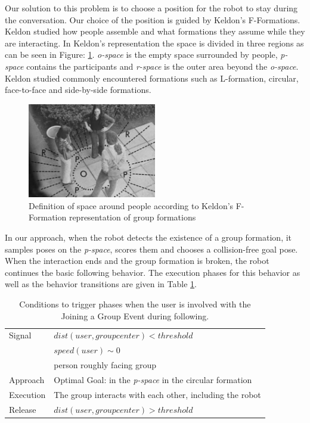 Our solution to this problem is to choose a position for the robot to stay during the conversation. Our choice of the position is guided by Keldon's F-Formations. Keldon studied how people assemble and what formations they assume while they are interacting. In Keldon's representation the space is divided in three regions as can be seen in Figure: \ref{fig:keldon}. \textit{o-space} is the empty space surrounded by people,  \textit{p-space} contains the participants and \textit{r-space} is the outer area beyond the \textit{o-space}. Keldon studied commonly encountered formations such as L-formation, circular, face-to-face and side-by-side formations.

\begin{figure}[ht!]
\centering
\includegraphics[width=0.5\textwidth]{pics/keldon}
\caption{Definition of space around people according to Keldon's F-Formation representation of group formations}
\label{fig:keldon}
\end{figure}

In our approach, when the robot detects the existence of a group formation, it samples poses on the \textit{p-space}, scores them and chooses a collision-free goal pose. When the interaction ends and the group formation is broken, the robot continues the basic following behavior. The execution phases for this behavior as well as the behavior transitions are given in Table \ref{table:situation_aware_list_group}.



\begin{table}[ht!]

    \caption{Conditions to trigger phases when the user is involved with the Joining a Group Event during following.}

    \centering
    	
  \begin{tabular}{l |  m{10cm}}    
    \toprule    
    Signal & {$dist(user, groupcenter)<threshold$}\\       
	                           & {$speed(user)\sim 0$} \\
	                           & {person roughly facing group}\\ \midrule		                           		                                
    Approach & {Optimal Goal: in the \textit{p-space} in the circular formation}\\       \midrule
    Execution & {The group interacts with each other, including the robot}\\  \midrule
    Release & {$dist(user, groupcenter)>threshold$}\\ 
    \bottomrule
  \end{tabular}
    \label{table:situation_aware_list_group}
\end{table}

